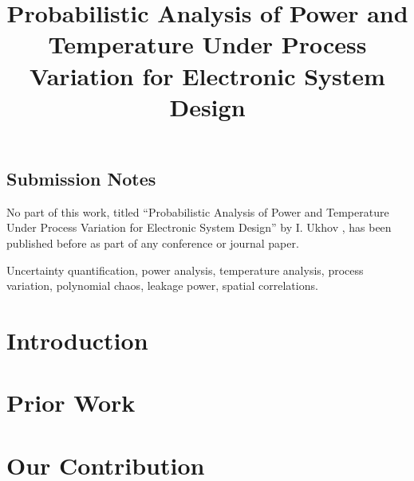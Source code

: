 \documentclass[journal]{IEEEtran}
\begin{document}
  

  \begin{titlepage}
    \section*{{\Huge Submission Notes}}
    \vspace{1em}
    \begin{center}
    \linespread{1.1}
    \Large
    No part of this work, titled ``Probabilistic Analysis of Power and Temperature Under Process Variation for Electronic System Design'' by I. Ukhov \etal, has been published before as part of any conference or journal paper.
    \end{center}
  \end{titlepage}

  \title{\TitleFont Probabilistic Analysis of Power and Temperature Under Process Variation for Electronic System Design}

  \author{
    
  }

  \maketitle

  \begin{abstract}
    
  \end{abstract}

  \begin{IEEEkeywords}
    Uncertainty quantification, power analysis, temperature analysis, process variation, polynomial chaos, leakage power, spatial correlations.
  \end{IEEEkeywords}

  \section{Introduction} 
  

  \section{Prior Work} 
  

  \section{Our Contribution} 
  
\end{document}
